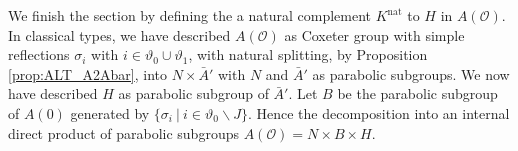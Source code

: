 \documentclass{amsart}
\theoremstyle{definition}
\newtheorem{example}[theorem]{Example}
\DeclareMathOperator{\nat}{nat}
\newcommand{\cP}{\mathcal{P}}
\newcommand{\cS}{\mathcal{S}}
\newcommand{\g}{\mathfrak{g}}
\newcommand{\frakS}{\mathfrak{S}}
\newcommand{\0}{\mathcal{O}}
\begin{document}


We finish the section by defining the a natural complement $K^{\nat}$ to $H$
in $A(\0)$.
In classical types, we have described $A(\0)$ as Coxeter group with simple reflections $\sigma_i$ with $i \in \vartheta_0 \cup \vartheta_1$, with natural splitting, by Proposition \ref{prop:ALT_A2Abar}, into $N \times \bar{A}'$ with $N$ and $\bar{A}'$ as parabolic subgroups.  We now have described $H$ as parabolic subgroup of $\bar{A}'$.  Let $B$ be the parabolic subgroup of $A(0)$ generated 
by $\{\sigma_i \ | \ i \in \vartheta_0 \backslash J \}$.  Hence
the decomposition into an internal direct product of parabolic subgroups 
$A(\0) = N \times B \times H$. 
\end{document}
